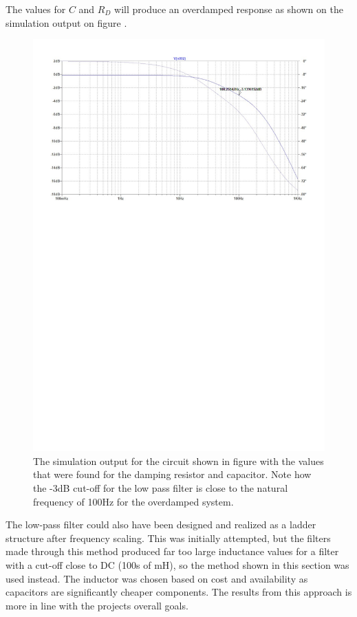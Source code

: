 The values for $C$ and $R_D$ will produce an overdamped response as shown on the simulation output on figure .
\begin{figure}[H]
    \centering
    \includegraphics[clip, trim=0 500 0 0, width=1\textwidth]{Sections/7_SystemDesign/Figures/7_1_5_SupplyFilterSimPlot.pdf}
    \caption{The simulation output for the circuit shown in figure  with the values that were found for the damping resistor and capacitor. Note how the -3dB cut-off for the low pass filter is close to the natural frequency of 100Hz for the overdamped system.}
    \label{fig_7_1_5_SupplyFilterSimOut}
\end{figure}

 The low-pass filter could also have been designed and realized as a ladder structure after frequency scaling. This was initially attempted, but the filters made through this method produced far too large inductance values for a filter with a cut-off close to DC (100s of mH), so the method shown in this section was used instead. The inductor was chosen based on cost and availability as capacitors are significantly cheaper components. The results from this approach is more in line with the projects overall goals.